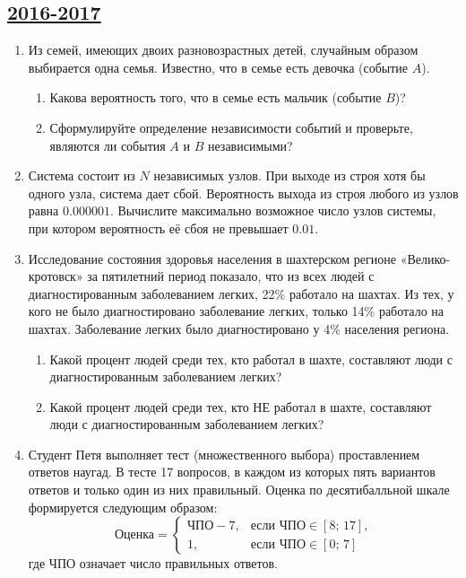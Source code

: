 \newpage
\subsection[2016-2017]{\hyperref[sec:sol_kr_01_2016_2017]{2016-2017}}
\label{sec:kr_01_2016_2017}

\begin{enumerate}
\item Из семей, имеющих двоих разновозрастных детей, случайным образом выбирается одна семья.
Известно, что в семье есть девочка (событие $A$).

\begin{enumerate}
\item	Какова вероятность того, что в семье есть мальчик (событие $B$)?
\item	Сформулируйте определение независимости событий и проверьте,
являются ли события $A$ и $B$ независимыми?
\end{enumerate}

\item Система состоит из $N$ независимых узлов.
При выходе из строя хотя бы одного узла, система дает сбой.
Вероятность выхода из строя любого из узлов равна $0.000001$.
Вычислите максимально возможное число узлов системы,
при котором вероятность её сбоя не превышает $0.01$.

\item Исследование состояния здоровья населения в шахтерском регионе
«Велико-кротовск» за пятилетний период показало,
что из всех людей с диагностированным заболеванием легких, 22\% работало на шахтах.
Из тех, у кого не было диагностировано заболевание легких, только 14\% работало на шахтах.
Заболевание легких было диагностировано у 4\% населения региона.

\begin{enumerate}
\item	Какой процент людей среди тех, кто работал в шахте,
составляют люди с диагностированным заболеванием легких?
\item	Какой процент людей среди тех, кто НЕ работал в шахте,
составляют люди с диагностированным заболеванием легких?
\end{enumerate}

\item  Студент Петя выполняет тест (множественного выбора) проставлением ответов наугад.
В тесте 17 вопросов, в каждом из которых пять вариантов ответов и только один из них правильный.
Оценка по десятибалльной шкале формируется следующим образом:
\[
\text{Оценка} =
\begin{cases}
\text{ЧПО} - 7, & \text{если $\text{ЧПО}\in [8;\,17]$,} \\
1,              & \text{если $\text{ЧПО}\in [0;\,7]$}
\end{cases}
\]
где ЧПО означает число правильных ответов.


\end{enumerate}
